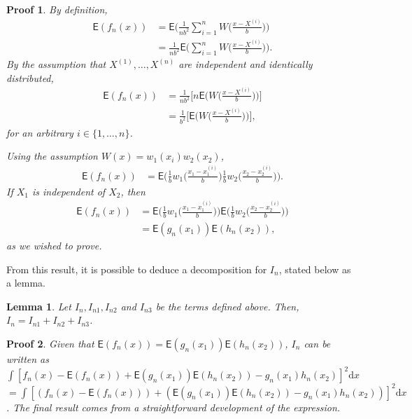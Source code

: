 \documentclass{article}
\newtheorem{lemma}{Lemma}[section]
\newtheorem{Proof}{Proof}[section]
\begin{document}
\begin{Proof}
    By definition,
    \begin{align}
        \mathsf{E} (f_n(x)) &= \mathsf{E} \Bigg( \frac{1}{nb^2} \sum_{i=1}^{n} W \Bigg( \frac{x - X^{(i)}}{b} \Bigg) \Bigg) \\
        &= \frac{1}{nb^2} \mathsf{E} \Bigg( \sum_{i=1}^{n} W \Bigg( \frac{x - X^{(i)}}{b} \Bigg) \Bigg).
    \end{align}
    By the assumption that $X^{(1)}, \dots, X^{(n)}$ are independent and identically distributed,
    \begin{align}
        \mathsf{E} (f_n(x)) &= \frac{1}{nb^2} \Bigg[ n \mathsf{E} \Bigg( W \Bigg( \frac{x - X^{(i)}}{b} \Bigg) \Bigg) \Bigg] \\
        &= \frac{1}{b^2} \Bigg[\mathsf{E} \Bigg( W \Bigg( \frac{x - X^{(i)}}{b} \Bigg) \Bigg) \Bigg],
    \end{align}
    for an arbitrary $i \in \{ 1, \dots, n \}$.

    Using the assumption $W(x) = w_1(x_i) w_2(x_2)$,
    \begin{align}
        \mathsf{E} (f_n(x)) &= \mathsf{E} \Bigg( \frac{1}{b} w_1 \Bigg( \frac{x_1 - x_1^{(i)}}{b} \Bigg) \frac{1}{b} w_2 \Bigg( \frac{x_2 - x_2^{(i)}}{b} \Bigg) \Bigg).
    \end{align}
    If $X_1$ is independent of $X_2$, then
    \begin{align}
        \mathsf{E} (f_n(x)) &= \mathsf{E} \Bigg( \frac{1}{b} w_1 \Bigg( \frac{x_1 - x_1^{(i)}}{b} \Bigg) \Bigg) \mathsf{E} \Bigg( \frac{1}{b} w_2 \Bigg( \frac{x_2 - x_2^{(i)}}{b} \Bigg) \Bigg) \\
        &= \mathsf{E} (g_n(x_1)) \mathsf{E} (h_n(x_2)),
    \end{align}
    as we wished to prove.
\end{Proof}

From this result, it is possible to deduce a decomposition for $I_n$, stated below as a lemma.
\begin{lemma}
    Let $I_n, I_{n1}, I_{n2}$ and $I_{n3}$ be the terms defined above. Then, $I_n = I_{n1} + I_{n2} + I_{n3}$.
\end{lemma}
\begin{Proof}
    Given that $\mathsf{E} (f_n(x)) = \mathsf{E} (g_n(x_1)) \mathsf{E} (h_n(x_2))$, $I_n$ can be written as $\int [f_n(x) - \mathsf{E} (f_n(x)) + \mathsf{E} (g_n(x_1)) \mathsf{E} (h_n(x_2)) - g_n(x_1) h_n(x_2)]^2 \mathrm{d} x$ $= \int [(f_n(x) - \mathsf{E} (f_n(x))) + (\mathsf{E} (g_n(x_1)) \mathsf{E} (h_n(x_2)) - g_n(x_1) h_n(x_2))]^2 \mathrm{d} x$. The final result comes from a straightforward development of the expression.
\end{Proof}
\end{document}
